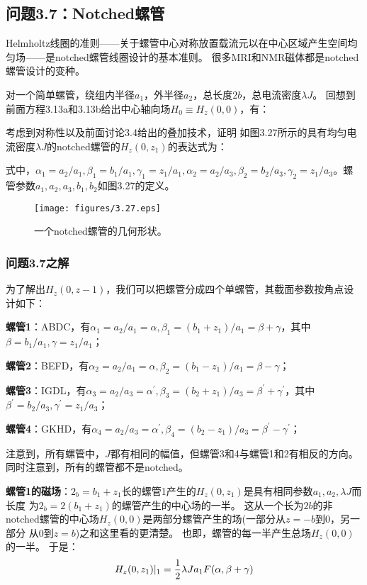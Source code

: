 \subsection{问题3.7：Notched螺管}
Helmholtz线圈的准则——关于螺管中心对称放置载流元以在中心区域产生空间均匀场——是notched螺管线圈设计的基本准则。
很多MRI和NMR磁体都是notched螺管设计的变种。

对一个简单螺管，绕组内半径$a_1$，外半径$a_2$，总长度$2b$，总电流密度$\lambda J$。
回想到前面方程3.13a和3.13b给出中心轴向场$H_0\equiv H_z(0, 0)$，有：

考虑到对称性以及前面讨论3.4给出的叠加技术，证明
如图3.27所示的具有均匀电流密度$\lambda J$的notched螺管的$H_z(0, z_1)$的表达式为：

式中，$\alpha_1=a_2/a_1,\beta_1=b_1/a_1,\gamma_1=z_1/a_1,\alpha_2=a_2/a_3,\beta_2=b_2/a_3,\gamma_2=z_1/a_3$。螺管参数$a_1, a_2, a_3, b_1, b_2$如图3.27的定义。
\begin{figure}[htbp]
	\centering
	\texttt{[image: figures/3.27.eps]}
	\caption{一个notched螺管的几何形状。}
\end{figure}


\subsubsection{问题3.7之解}
为了解出$H_z(0,z-1)$，我们可以把螺管分成四个单螺管，其截面参数按角点设计如下：

\textbf{螺管1}：ABDC，有$\alpha_1=a_2/a_1=\alpha,\beta_1=(b_1+z_1)/a_1=\beta+\gamma$，其中
$\beta=b_1/a_1,\gamma=z_1/a_1$；

\textbf{螺管2}：BEFD，有$\alpha_2=a_2/a_1=\alpha,\beta_2=(b_1-z_1)/a_1=\beta-\gamma$；

\textbf{螺管3}：IGDL，有$\alpha_3=a_2/a_3=\alpha^\prime,\beta_3=(b_2+z_1)/a_3=\beta^\prime+\gamma^\prime$，其中$\beta^\prime=b_2/a_3,\gamma^\prime=z_1/a_3$；

\textbf{螺管4}：GKHD，有$\alpha_4=a_2/a_3=\alpha^\prime,\beta_4=(b_2-z_1)/a_3=\beta^\prime-\gamma^\prime$；

注意到，所有螺管中，$J$都有相同的幅值，但螺管3和4与螺管1和2有相反的方向。同时注意到，所有的螺管都不是notched。

\textbf{螺管1的磁场}：$2_b=b_1+z_1$长的螺管1产生的$H_z(0, z_1)$是具有相同参数$a_1, a_2,\lambda J$而长度
为$2_b = 2(b_1+z_1)$的螺管产生的中心场的一半。
这从一个长为$2b$的非notched螺管的中心场$H_z(0, 0)$是两部分螺管产生的场(一部分从$z=−b$到$0$，另一部分
从$0$到$z=b$)之和这里看的更清楚。
也即，螺管的每一半产生总场$H_z(0, 0)$的一半。 于是：
$$
H_{z}(0,z_{1})|_{1}=\frac{1}{2}\lambda Ja_{1}F(\alpha,\beta+\gamma)\\%
$$

